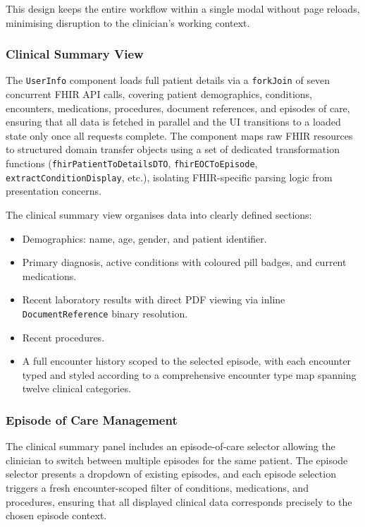 This design keeps the entire workflow within a single modal without page
reloads, minimising disruption to the clinician's working context.

\subsubsection{Clinical Summary View}

The \texttt{UserInfo} component loads full patient details via a \texttt{forkJoin}
of seven concurrent FHIR API calls, covering patient demographics, conditions,
encounters, medications, procedures, document references, and episodes of care,
ensuring that all data is fetched in parallel and the UI transitions to a
loaded state only once all requests complete. The component maps raw FHIR
resources to structured domain transfer objects using a set of dedicated
transformation functions (\texttt{fhirPatientToDetailsDTO},
\texttt{fhirEOCToEpisode}, \texttt{extractConditionDisplay}, etc.), isolating
FHIR-specific parsing logic from presentation concerns.

The clinical summary view organises data into clearly defined sections:
\begin{itemize}
    \item Demographics: name, age, gender, and patient identifier.
    \item Primary diagnosis, active conditions with coloured pill badges,
          and current medications.
    \item Recent laboratory results with direct PDF viewing via inline
          \texttt{DocumentReference} binary resolution.
    \item Recent procedures.
    \item A full encounter history scoped to the selected episode, with each
          encounter typed and styled according to a comprehensive encounter
          type map spanning twelve clinical categories.
\end{itemize}

\subsubsection{Episode of Care Management}

The clinical summary panel includes an episode-of-care selector allowing the
clinician to switch between multiple episodes for the same patient. The episode
selector presents a dropdown of existing episodes, and each episode selection
triggers a fresh encounter-scoped filter of conditions, medications, and
procedures, ensuring that all displayed clinical data corresponds precisely to
the chosen episode context.

